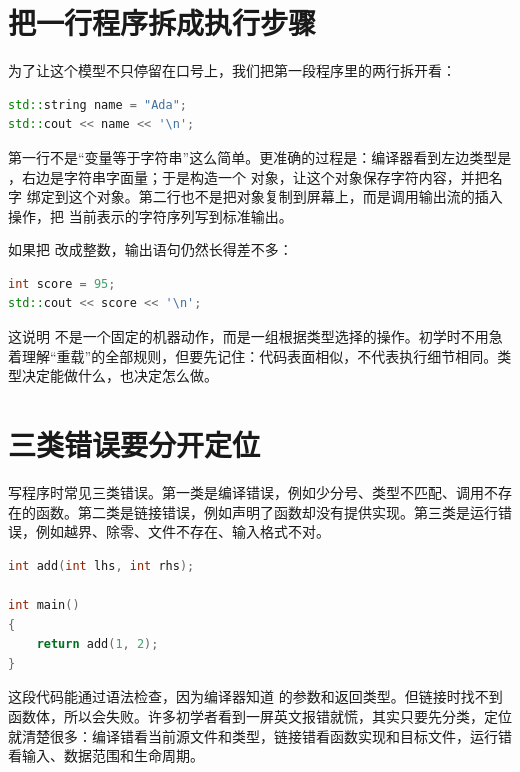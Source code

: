 \section{把一行程序拆成执行步骤}

为了让这个模型不只停留在口号上，我们把第一段程序里的两行拆开看：

\begin{lstlisting}[language=C++,caption={两行代码里的对象变化}]
std::string name = "Ada";
std::cout << name << '\n';
\end{lstlisting}

第一行不是“变量等于字符串”这么简单。更准确的过程是：编译器看到左边类型是 ，右边是字符串字面量；于是构造一个  对象，让这个对象保存字符内容，并把名字  绑定到这个对象。第二行也不是把对象复制到屏幕上，而是调用输出流的插入操作，把  当前表示的字符序列写到标准输出。

如果把  改成整数，输出语句仍然长得差不多：

\begin{lstlisting}[language=C++,caption={同一个输出符号背后是不同操作}]
int score = 95;
std::cout << score << '\n';
\end{lstlisting}

这说明 \code{<<} 不是一个固定的机器动作，而是一组根据类型选择的操作。初学时不用急着理解“重载”的全部规则，但要先记住：\cpp 代码表面相似，不代表执行细节相同。类型决定能做什么，也决定怎么做。

\section{三类错误要分开定位}

写程序时常见三类错误。第一类是编译错误，例如少分号、类型不匹配、调用不存在的函数。第二类是链接错误，例如声明了函数却没有提供实现。第三类是运行错误，例如越界、除零、文件不存在、输入格式不对。

\begin{lstlisting}[language=C++,caption={声明了函数但没有实现会导致链接错误}]
int add(int lhs, int rhs);

int main()
{
    return add(1, 2);
}
\end{lstlisting}

这段代码能通过语法检查，因为编译器知道  的参数和返回类型。但链接时找不到函数体，所以会失败。许多初学者看到一屏英文报错就慌，其实只要先分类，定位就清楚很多：编译错看当前源文件和类型，链接错看函数实现和目标文件，运行错看输入、数据范围和生命周期。


